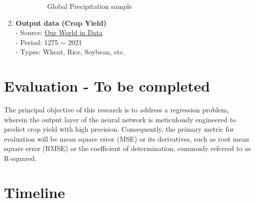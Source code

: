 \documentclass[11pt, oneside]{article}   	%
\begin{document}
\begin{enumerate}
\begin{enumerate}[label=(\alph*)]
\begin{figure}[htbp]
    		\begin{minipage}[t]{0.6\textwidth}
	    \caption{Global Precipitation sample}
    		\label{fig1}
   	 	\end{minipage}%
	\end{figure}
	\end{enumerate}
\item \textbf{Output data (Crop Yield)} \\
- Source: \href{https://ourworldindata.org/crop-yields#explore-data-on-crop-yields}{Our World in Data} \\
- Period: 1275 $\sim$ 2021 \\
- Types: Wheat, Rice, Soybean, etc.
\end{enumerate}

\section*{Evaluation - To be completed}

The principal objective of this research is to address a regression problem, wherein the output layer of the neural network is meticulously engineered to predict crop yield with high precision. Consequently, the primary metric for evaluation will be mean square error (MSE) or its derivatives, such as root mean square error (RMSE) or the coefficient of determination, commonly referred to as R-squared.

\section*{Timeline}
\end{document}
